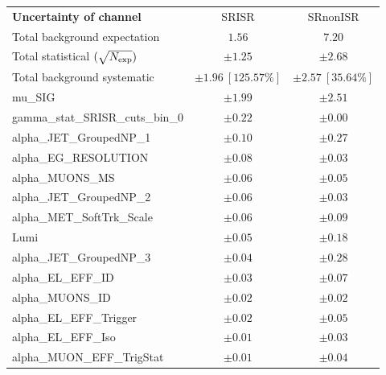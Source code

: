 \begin{table}
\begin{center}
\setlength{\tabcolsep}{0.0pc}
\begin{tabular*}{\textwidth}{@{\extracolsep{\fill}}lcc}
\noalign{\smallskip}\hline\noalign{\smallskip}
{\bf Uncertainty of channel}                                    & SRISR            & SRnonISR            \\
\noalign{\smallskip}\hline\noalign{\smallskip}
Total background expectation             &  $1.56$        &  $7.20$       \\
\noalign{\smallskip}\hline\noalign{\smallskip}
Total statistical $(\sqrt{N_{\rm exp}})$              & $\pm 1.25$        & $\pm 2.68$       \\
Total background systematic               & $\pm 1.96\ [125.57\%] $        & $\pm 2.57\ [35.64\%] $             \\
\noalign{\smallskip}\hline\noalign{\smallskip}
\noalign{\smallskip}\hline\noalign{\smallskip}
mu\_SIG         & $\pm 1.99$          & $\pm 2.51$       \\
gamma\_stat\_SRISR\_cuts\_bin\_0         & $\pm 0.22$          & $\pm 0.00$       \\
alpha\_JET\_GroupedNP\_1         & $\pm 0.10$          & $\pm 0.27$       \\
alpha\_EG\_RESOLUTION         & $\pm 0.08$          & $\pm 0.03$       \\
alpha\_MUONS\_MS         & $\pm 0.06$          & $\pm 0.05$       \\
alpha\_JET\_GroupedNP\_2         & $\pm 0.06$          & $\pm 0.03$       \\
alpha\_MET\_SoftTrk\_Scale         & $\pm 0.06$          & $\pm 0.09$       \\
Lumi         & $\pm 0.05$          & $\pm 0.18$       \\
alpha\_JET\_GroupedNP\_3         & $\pm 0.04$          & $\pm 0.28$       \\
alpha\_EL\_EFF\_ID         & $\pm 0.03$          & $\pm 0.07$       \\
alpha\_MUONS\_ID         & $\pm 0.02$          & $\pm 0.02$       \\
alpha\_EL\_EFF\_Trigger         & $\pm 0.02$          & $\pm 0.05$       \\
alpha\_EL\_EFF\_Iso         & $\pm 0.01$          & $\pm 0.03$       \\
alpha\_MUON\_EFF\_TrigStat         & $\pm 0.01$          & $\pm 0.04$       \\

\end{tabular*}
\end{center}
\end{table}
